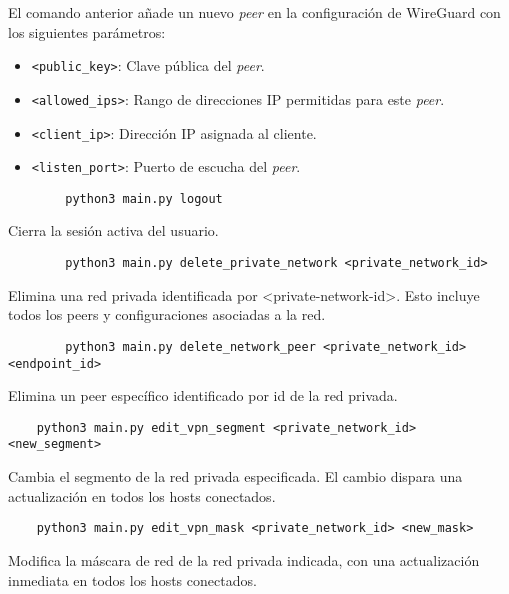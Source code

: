         El comando anterior añade un nuevo \textit{peer} en la configuración de WireGuard con los siguientes parámetros:  
        \begin{itemize}
            \item \texttt{<public\_key>}: Clave pública del \textit{peer}.
            \item \texttt{<allowed\_ips>}: Rango de direcciones IP permitidas para este \textit{peer}.
            \item \texttt{<client\_ip>}: Dirección IP asignada al cliente.
            \item \texttt{<listen\_port>}: Puerto de escucha del \textit{peer}.
        \end{itemize}     
   
    \begin{verbatim}
        python3 main.py logout
    \end{verbatim}
    Cierra la sesión activa del usuario. 
    
    \begin{verbatim}
        python3 main.py delete_private_network <private_network_id>
    \end{verbatim}
    Elimina una red privada identificada por <private-network-id>. Esto incluye todos los peers y configuraciones asociadas a la red.
    
    \begin{verbatim}
        python3 main.py delete_network_peer <private_network_id> <endpoint_id>
    \end{verbatim}
    Elimina un peer específico identificado por id de la red privada.
    
    \begin{verbatim}
    python3 main.py edit_vpn_segment <private_network_id> <new_segment>
    \end{verbatim}
    Cambia el segmento de la red privada especificada. El cambio dispara una actualización en todos los hosts conectados.
    
    \begin{verbatim}
    python3 main.py edit_vpn_mask <private_network_id> <new_mask>
    \end{verbatim} 
    Modifica la máscara de red de la red privada indicada, con una actualización inmediata en todos los hosts conectados.
    

